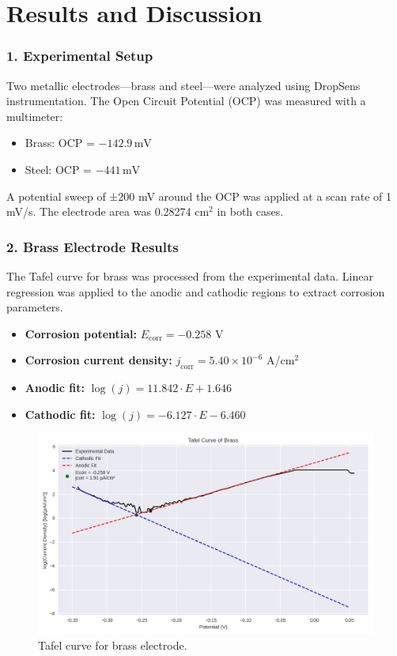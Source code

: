 \section{Results and Discussion}

\subsubsection*{1. Experimental Setup}

Two metallic electrodes—brass and steel—were analyzed using DropSens instrumentation. The Open Circuit Potential (OCP) was measured with a multimeter:
\begin{itemize}
  \item Brass: OCP = \( -142.9\,\text{mV} \)
  \item Steel: OCP = \( -441\,\text{mV} \)
\end{itemize}

A potential sweep of ±200 mV around the OCP was applied at a scan rate of 1 mV/s. The electrode area was 0.28274 cm\(^2\) in both cases.

\vspace{0.2cm}
\subsubsection*{2. Brass Electrode Results}

The Tafel curve for brass was processed from the experimental data. Linear regression was applied to the anodic and cathodic regions to extract corrosion parameters.

\begin{itemize}
    \item \textbf{Corrosion potential:} \( E_{\text{corr}} = -0.258 \) V
    \item \textbf{Corrosion current density:} \( j_{\text{corr}} = 5.40 \times 10^{-6} \) A/cm\(^2\)
    \item \textbf{Anodic fit:} \( \log(j) = 11.842 \cdot E + 1.646 \)
    \item \textbf{Cathodic fit:} \( \log(j) = -6.127 \cdot E - 6.460 \)
\end{itemize}

\begin{figure}[ht!]
    \centering
    \includegraphics[width=0.7\linewidth]{Figures/TAFEL-BRASS.png}
    \caption{Tafel curve for brass electrode.}
    \label{fig:tafel_brass}
\end{figure}

